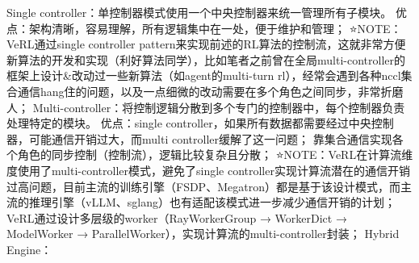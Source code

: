 \documentclass{pkuthesis}
\begin{document}
Single controller：单控制器模式使用一个中央控制器来统一管理所有子模块。
优点：架构清晰，容易理解，所有逻辑集中在一处，便于维护和管理；
⭐️NOTE：VeRL通过single controller pattern来实现前述的RL算法的控制流，这就非常方便新算法的开发和实现（利好算法同学），比如笔者之前曾在全局multi-controller的框架上设计&改动过一些新算法（如agent的multi-turn rl），经常会遇到各种nccl集合通信hang住的问题，以及一点细微的改动需要在多个角色之间同步，非常折磨人；
Multi-controller：将控制逻辑分散到多个专门的控制器中，每个控制器负责处理特定的模块。
优点：single controller，如果所有数据都需要经过中央控制器，可能通信开销过大，而multi controller缓解了这一问题；
靠集合通信实现各个角色的同步控制（控制流），逻辑比较复杂且分散；
⭐️NOTE：VeRL在计算流维度使用了multi-controller模式，避免了single controller实现计算流潜在的通信开销过高问题，目前主流的训练引擎（FSDP、Megatron）都是基于该设计模式，而主流的推理引擎（vLLM、sglang）也有适配该模式进一步减少通信开销的计划；
VeRL通过设计多层级的worker（RayWorkerGroup → WorkerDict → ModelWorker → ParallelWorker），实现计算流的multi-controller封装；
Hybrid Engine：
\end{document}
